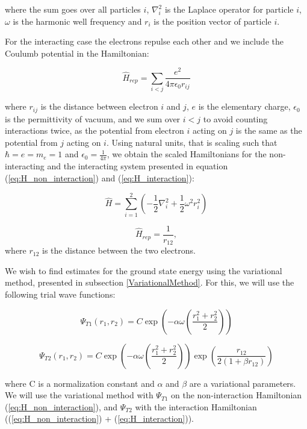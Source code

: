 \documentclass[norsk,a4paper,12pt]{article}
\begin{document}
where the sum goes over all particles $i$, $\nabla_i^2$ is the Laplace operator for particle $i$, $\omega$ is the harmonic well frequency and $r_i$ is the position vector of particle $i$. 

For the interacting case the electrons repulse each other and we include the Coulumb potential in the Hamiltonian:

\begin{equation}
    \hat{H}_{rep} = \sum_{i<j} \frac{e^2}{4\pi \epsilon_0 r_{ij}}
    \label{eq:H_interaction_unit}
\end{equation}

where $r_{ij}$ is the distance between electron $i$ and $j$, $e$ is the elementary charge, $\epsilon_ 0$ is the permittivity of vacuum, and we sum over $i < j$ to avoid counting interactions twice, as the potential from electron $i$ acting on $j$ is the same as the potential from $j$ acting on $i$. Using natural units, that is scaling such that $\hbar = e = m_e = 1$ and $\epsilon_0 = \frac{1}{4\pi}$, we obtain the scaled Hamiltonians for the non-interacting and the interacting system presented in equation (\ref{eq:H_non_interaction}) and (\ref{eq:H_interaction}):

\begin{equation}
    \hat{H} = \sum_{i=1}^{2} (-\frac{1}{2}\nabla_i^2 + \frac{1}{2} \omega^2r_i^2) 
    \label{eq:H_non_interaction}
\end{equation}

\begin{equation}
    \hat{H}_{rep} = \frac{1}{r_{12}},
    \label{eq:H_interaction}
\end{equation}
where $r_{12}$ is the distance between the two electrons.

We wish to find estimates for the ground state energy using the variational method, presented in subsection \ref{VariationalMethod}. For this, we will use the following trial wave functions:

\begin{equation}
    \Psi_{T1} (r_1, r_2) = C\exp(-\alpha \omega (\frac{r_1^2 + r_2^2}{2}))
    \label{eq:PsiT1}
\end{equation}

\begin{equation}
    \Psi_{T2}(r_1, r_2) = C\exp(-\alpha \omega (\frac{r_1^2 + r_2^2}{2}))\exp(\frac{r_{12}}{2(1+\beta r_{12})})
    \label{eq:PsiT2}
\end{equation}

where C is a normalization constant and $\alpha$ and $\beta$ are a variational parameters. We will use the variational method with $\Psi_{T1}$ on the non-interaction Hamiltonian (\ref{eq:H_non_interaction}), and $\Psi_{T2}$ with the interaction Hamiltonian ((\ref{eq:H_non_interaction}) + (\ref{eq:H_interaction})).
\end{document}
